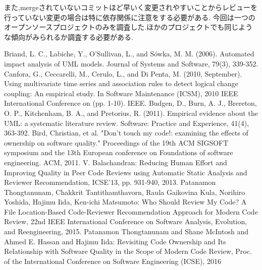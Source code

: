 \documentclass[submit,ses,noauthor]{ipsj} %
\begin{document}
また,mergeされていないコミットほど早いく変更されやすいことからレビューを行っていない変更の場合は特に依存関係に注意をする必要がある.
今回は一つのオープンソースプロジェクトのみを調査した.ほかのプロジェクトでも同じような傾向がみられるか調査する必要がある.



\begin{thebibliography}{10}
Briand, L. C., Labiche, Y., O’Sullivan, L., and Sówka, M. M. (2006). Automated impact analysis of UML models. Journal of Systems and Software, 79(3), 339-352.
 Canfora, G., Ceccarelli, M., Cerulo, L., and Di Penta, M. (2010, September). Using multivariate time series and association rules to detect logical change coupling: An empirical study. In Software Maintenance (ICSM), 2010 IEEE International Conference on (pp. 1-10). IEEE.
Budgen, D., Burn, A. J., Brereton, O. P., Kitchenham, B. A., and Pretorius, R. (2011). Empirical evidence about the UML: a systematic literature review. Software: Practice and Experience, 41(4), 363-392.
Bird, Christian, et al. "Don't touch my code!: examining the effects of ownership on software quality." Proceedings of the 19th ACM SIGSOFT symposium and the 13th European conference on Foundations of software engineering. ACM, 2011.
V. Balachandran: Reducing Human Effort and Improving Quality in Peer Code Reviews using Automatic Static Analysis and Reviewer Recommendation, ICSE'13, pp. 931-940, 2013.
Patanamon Thongtanunam, Chakkrit Tantithamthavorn, Raula Gaikovina Kula, Norihiro Yoshida, Hajimu Iida, Ken-ichi Matsumoto: Who Should Review My Code? A File Location-Based Code-Reviewer Recommendation Approach for Modern Code Review, 22nd IEEE International Conference on Software Analysis, Evolution, and Reengineering, 2015.
Patanamon Thongtanunam and Shane McIntosh and Ahmed E. Hassan and Hajimu Iida: Revisiting Code Ownership and Its Relationship with Software Quality in the Scope of Modern Code Review, Proc. of the International Conference on Software Engineering (ICSE), 2016
 \end{thebibliography}
\end{document}

